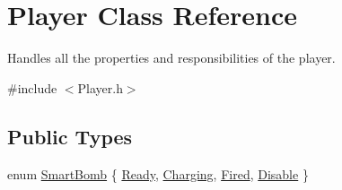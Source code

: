 \hypertarget{class_player}{}\section{Player Class Reference}
\label{class_player}


Handles all the properties and responsibilities of the player.  




{\ttfamily \#include $<$Player.\+h$>$}

\subsection*{Public Types}
\begin{DoxyCompactItemize}
\item 
enum \hyperlink{class_player_afd539a18e0e4c3bbf07c820914c0511e}{Smart\+Bomb} \{ \hyperlink{class_player_afd539a18e0e4c3bbf07c820914c0511ea62fc7d85d72db94f418347b5e3a25d28}{Ready}, 
\hyperlink{class_player_afd539a18e0e4c3bbf07c820914c0511ea86d19f9b31edc54d666dd859955f2ae4}{Charging}, 
\hyperlink{class_player_afd539a18e0e4c3bbf07c820914c0511eaefb39c3c6842102cf73bd0203e41b338}{Fired}, 
\hyperlink{class_player_afd539a18e0e4c3bbf07c820914c0511ea0dc1ade8c7310201d494698675fd011d}{Disable}
 \}
\end{DoxyCompactItemize}
